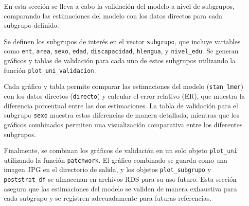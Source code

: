 \documentclass[
  12pt,
]{book}
\begin{document}
En esta sección se lleva a cabo la validación del modelo a nivel de subgrupos, comparando las estimaciones del modelo con los datos directos para cada subgrupo definido.

Se definen los subgrupos de interés en el vector \texttt{subgrupo}, que incluye variables como \texttt{ent}, \texttt{area}, \texttt{sexo}, \texttt{edad}, \texttt{discapacidad}, \texttt{hlengua}, y \texttt{nivel\_edu}. Se generan gráficos y tablas de validación para cada uno de estos subgrupos utilizando la función \texttt{plot\_uni\_validacion}.

Cada gráfico y tabla permite comparar las estimaciones del modelo (\texttt{stan\_lmer}) con los datos directos (\texttt{directo}) y calcular el error relativo (ER), que muestra la diferencia porcentual entre las dos estimaciones. La tabla de validación para el subgrupo \texttt{sexo} muestra estas diferencias de manera detallada, mientras que los gráficos combinados permiten una visualización comparativa entre los diferentes subgrupos.

Finalmente, se combinan los gráficos de validación en un solo objeto \texttt{plot\_uni} utilizando la función \texttt{patchwork}. El gráfico combinado se guarda como una imagen JPG en el directorio de salida, y los objetos \texttt{plot\_subgrupo} y \texttt{poststrat\_df} se almacenan en archivos RDS para su uso futuro. Esta sección asegura que las estimaciones del modelo se validen de manera exhaustiva para cada subgrupo y se registren adecuadamente para futuras referencias.
\end{document}
